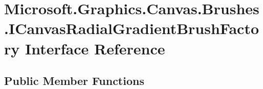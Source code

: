 \hypertarget{interface_microsoft_1_1_graphics_1_1_canvas_1_1_brushes_1_1_i_canvas_radial_gradient_brush_factory}{}\section{Microsoft.\+Graphics.\+Canvas.\+Brushes.\+I\+Canvas\+Radial\+Gradient\+Brush\+Factory Interface Reference}
\label{interface_microsoft_1_1_graphics_1_1_canvas_1_1_brushes_1_1_i_canvas_radial_gradient_brush_factory}
\subsection*{Public Member Functions}
